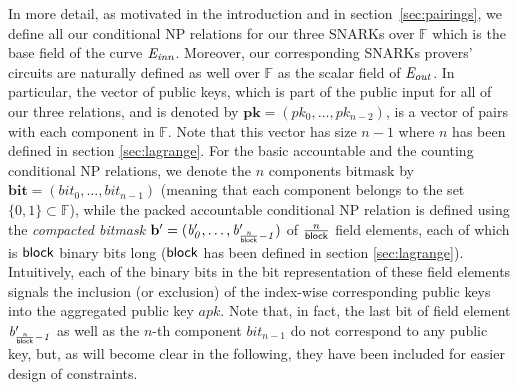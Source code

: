 \noindent In more detail, as motivated in the introduction  and in  section~\ref{sec:pairings}, 
we define all our conditional NP relations for our three SNARKs over $\mathbb{F}$ which is the base field of the curve 
$\mathit{E}_{\mathit{inn}}$. Moreover, our corresponding SNARKs provers' circuits are naturally defined as well over 
$\mathbb{F}$ as the scalar field of $\mathit{E}_{\mathit{out}}$. In particular, the vector of public keys, which is part of the public input for all of 
our three relations, and is denoted by $\mathbf{pk} = (\mathit{pk_0}, \ldots, \mathit{pk_{n-2}})$, is a vector of pairs with each component 
in $\mathbb{F}$. Note that this vector has size $n-1$ where $n$ has been defined in 
section \ref{sec:lagrange}. For the basic accountable and the counting conditional NP relations, we denote 
the $n$ components bitmask by $\mathbf{bit} = (\mathit{bit_0}, \ldots, \mathit{bit_{n-1}})$ 
(meaning that each component belongs to the set $\{0,1\} \subset \mathbb{F}$), 
while the packed accountable conditional NP relation is defined using the \emph{compacted bitmask} 
$\mathbf{b'} = (\mathit{b'_{0}}, \ldots, \mathit{b'_{\frac{n}{\mathsf{block}}-1}})$ of $\frac{n}{\mathsf{block}}$ field elements, 
each of which is $\mathsf{block}$ binary bits long ($\mathsf{block}$ has been defined in section \ref{sec:lagrange}). 
Intuitively, each of the binary bits in the bit representation of these field elements signals the 
inclusion (or exclusion) of the index-wise corresponding public keys into the aggregated public key $\mathit{apk}$. Note that, in fact, 
the last bit of field element $\mathit{b'_{\frac{n}{\mathsf{block}}-1}}$ as well as the $n$-th component $\mathit{bit_{n-1}}$ do not correspond to any public key, 
but, as will become clear in the following, they have been included for easier design of constraints. \\ %

